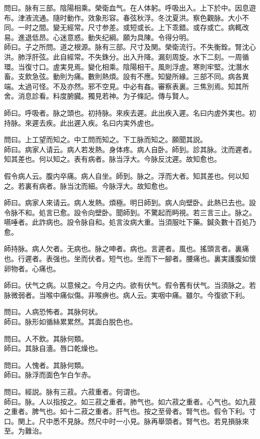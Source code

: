 \documentclass[b5paper,twoside,zihao=-4,UTF8]{ctexbook}
\begin{document}
問曰。脉有三部。陰陽相乘。榮衛血气。在人体躬。呼吸出入。上下於中。因息遊布。津液流通。隨时動作。效象形容。春弦秋浮。冬沈夏洪。察色觀脉。大小不同。一时之間。變无經常。尺寸参差。或短或长。上下乖錯。或存或亡。病輒改易。進退低昂。心迷意惑。動失纪綱。願为具陳。令得分明。\\
師曰。子之所問。道之根源。脉有三部。尺寸及関。榮衛流行。不失衡銓。腎沈心洪。肺浮肝弦。此自經常。不失銖分。出入升降。漏刻周旋。水下二刻。一周循環。当復寸口。虗実見焉。變化相乘。陰陽相干。風則浮虗。寒則牢堅。沈潛水畜。支飲急弦。動則为痛。數則熱煩。設有不應。知變所緣。三部不同。病各異端。太過可怪。不及亦然。邪不空見。中必有姦。審察表裏。三焦別焉。知其所舍。消息診看。料度腑臓。獨見若神。为子條記。傳与賢人。

師曰。呼吸者。脉之頭也。初持脉。來疾去遲。此出疾入遲。名曰内虗外実也。初持脉。來遲去疾。此出遲入疾。名曰内実外虗也。

問曰。上工望而知之。中工問而知之。下工脉而知之。願聞其説。\\
師曰。病家人请云。病人若发熱。身体疼。病人自卧。師到。診其脉。沈而遲者。知其差也。何以知之。表有病者。脉当浮大。今脉反沈遲。故知愈也。

假令病人云。腹内卒痛。病人自坐。師到。脉之。浮而大者。知其差也。何以知之。若裏有病者。脉当沈而細。今脉浮大。故知愈也。

師曰。病家人來请云。病人发熱。煩極。明日師到。病人向壁卧。此熱已去也。設令脉不和。処言已愈。設令向壁卧。聞師到。不驚起而眄視。若三言三止。脉之。嚥唾者。此詐病也。設令脉自和。処言汝病大重。当須服吐下藥。鍼灸數十百処乃愈。

師持脉。病人欠者。无病也。脉之呻者。病也。言遲者。風也。搖頭言者。裏痛也。行遲者。表强也。坐而伏者。短气也。坐而下一腳者。腰痛也。裏実護腹如懷卵物者。心痛也。

師曰。伏气之病。以意候之。今月之内。欲有伏气。假令舊有伏气。当須脉之。若脉微弱者。当喉中痛似傷。非喉痹也。病人云。実咽中痛。雖尔。今復欲下利。

問曰。人病恐怖者。其脉何状。\\
師曰。脉形如循絲累累然。其面白脱色也。

問曰。人不飲。其脉何類。\\
師曰。其脉自濇。唇口乾燥也。

問曰。人愧者。其脉何類。\\
師曰。脉浮而面色乍白乍赤。

問曰。經説。脉有三菽。六菽重者。何谓也。\\
師曰。脉。人以指按之。如三菽之重者。肺气也。如六菽之重者。心气也。如九菽之重者。脾气也。如十二菽之重者。肝气也。按之至骨者。腎气也。假令下利。寸口。関上。尺中悉不見脉。然尺中时一小見。脉再舉頭者。腎气也。若見損脉來至。为難治。
\end{document}
